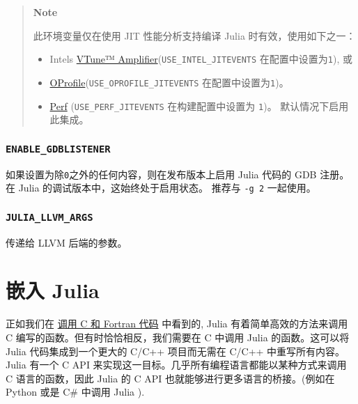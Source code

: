 \begin{quote}
\textbf{Note}

此环境变量仅在使用 JIT 性能分析支持编译 Julia 时有效，使用如下之一：

\begin{itemize}
\item Intel{\textquotesingle}s \href{https://software.intel.com/en-us/vtune}{VTune™ Amplifier}(\texttt{USE\_INTEL\_JITEVENTS} 在配置中设置为\texttt{1}), 或


\item \href{http://oprofile.sourceforge.net/news/}{OProfile}(\texttt{USE\_OPROFILE\_JITEVENTS} 在配置中设置为\texttt{1})。


\item \href{https://perf.wiki.kernel.org}{Perf} (\texttt{USE\_PERF\_JITEVENTS} 在构建配置中设置为 \texttt{1})。 默认情况下启用此集成。

\end{itemize}
\end{quote}


\hypertarget{1655388421400272774}{}


\subsection{\texttt{ENABLE\_GDBLISTENER}}



如果设置为除\texttt{0}之外的任何内容，则在发布版本上启用 Julia 代码的 GDB 注册。 在 Julia 的调试版本中，这始终处于启用状态。 推荐与 \texttt{-g 2} 一起使用。



\hypertarget{12744946110825549407}{}


\subsection{\texttt{JULIA\_LLVM\_ARGS}}



传递给 LLVM 后端的参数。



\hypertarget{12804520762715277004}{}


\chapter{嵌入 Julia}



正如我们在 \href{@ref}{调用 C 和 Fortran 代码} 中看到的, Julia 有着简单高效的方法来调用 C 编写的函数。但有时恰恰相反，我们需要在 C 中调用 Julia 的函数。这可以将 Julia 代码集成到一个更大的 C/C++ 项目而无需在 C/C++ 中重写所有内容。Julia 有一个 C API 来实现这一目标。几乎所有编程语言都能以某种方式来调用 C 语言的函数，因此 Julia 的 C API 也就能够进行更多语言的桥接。(例如在 Python 或是 C\# 中调用 Julia ).




